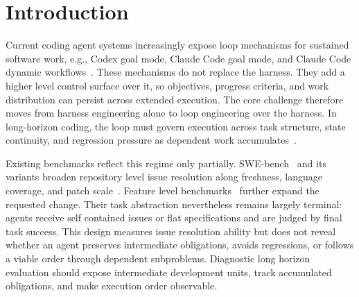 \vspace{-4pt}
\section{Introduction}
\label{sec:introduction}

Current coding agent systems increasingly expose loop mechanisms for sustained software work, e.g., Codex goal mode, Claude Code goal mode, and Claude Code dynamic workflows~\cite{openai_codex_prompting,anthropic_claude_code_goal,anthropic_claude_code_workflows,anthropic_claude_code_subagents}. These mechanisms do not replace the harness. They add a higher level control surface over it, so objectives, progress criteria, and work distribution can persist across extended execution. The core challenge therefore moves from harness engineering alone to loop engineering over the harness. In long-horizon coding, the loop must govern execution across task structure, state continuity, and regression pressure as dependent work accumulates~\cite{anthropic_c_compiler}.

 Existing benchmarks reflect this regime only partially. SWE-bench~\cite{jimenez2023swe} and its variants broaden repository level issue resolution along freshness, language coverage, and patch scale~\cite{zan2025multi,yang2024swe,liu2025swebenchm}. Feature level benchmarks~\cite{zhou2026featurebench,chen2025featbench,thai2025swe} further expand the requested change. Their task abstraction nevertheless remains largely terminal: agents receive self contained issues or flat specifications and are judged by final task success. This design measures issue resolution ability but does not reveal whether an agent preserves intermediate obligations, avoids regressions, or follows a viable order through dependent subproblems. Diagnostic long horizon evaluation should expose intermediate development units, track accumulated obligations, and make execution order observable.



